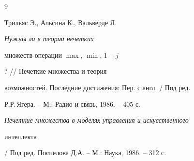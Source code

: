 \begin{thebibliography}{9}







Трильяс Э., Альсина К., Вальверде Л. {\em Нужны ли в теории нечетких


множеств операции $\max$, $\min$, $1-j$}? // Нечеткие множества и теория


возможностей. Последние достижения: Пер. с англ. / Под ред.


Р.Р.\,Ягера. -- М.: Радио и связь, 1986. -- 405 с.




{\em Нечеткие множества в моделях управления и искусственного


интеллекта} / Под ред. Поспелова Д.А. -- М.: Наука, 1986. -- 312 с.








\end{thebibliography}





\vskip 2cm

















